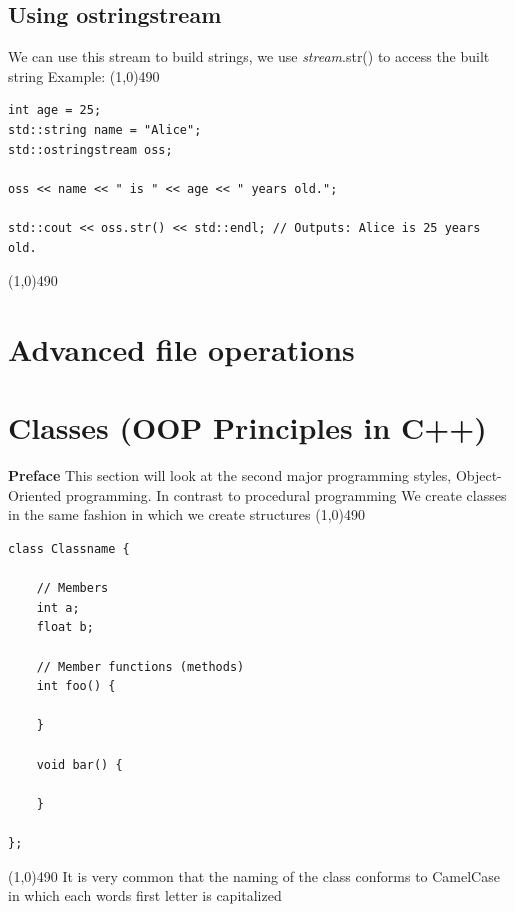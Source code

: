 \documentclass{report}
\begin{document}
     \subsection{Using ostringstream}
     \bigbreak \noindent 
     We can use this stream to build strings, we use \textit{stream}.str() to access the built string
     \bigbreak \noindent 
     Example:
     \bigbreak \noindent 
     \line(1,0){490}
     \begin{verbatim}
int age = 25;
std::string name = "Alice";
std::ostringstream oss;

oss << name << " is " << age << " years old.";

std::cout << oss.str() << std::endl; // Outputs: Alice is 25 years old.
     \end{verbatim}
     \line(1,0){490}

    \pagebreak \bigbreak \noindent 
    \section{\LARGE Advanced file operations}
    \bigbreak \noindent 

    \pagebreak \bigbreak \noindent 
    \section{\LARGE Classes (OOP Principles in C++)}
    \bigbreak \noindent 
    \textbf{Preface} This section will look at the second major programming styles, Object-Oriented programming. In contrast to procedural programming
    \bigbreak \noindent 
    We create classes in the same fashion in which we create structures
    \bigbreak \noindent 
    \line(1,0){490}
    \begin{verbatim}
class Classname {

    // Members
    int a;
    float b;

    // Member functions (methods)
    int foo() {

    }

    void bar() {

    }

};
    \end{verbatim}
    \line(1,0){490}
    \bigbreak \noindent 
    It is very common that the naming of the class conforms to CamelCase in which each words first letter is capitalized

    \bigbreak \noindent 
\end{document}
